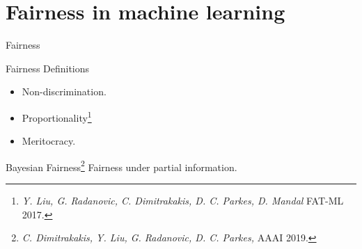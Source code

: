 \section{Fairness in machine learning}



\begin{frame}
  \begin{center} 
    {\Huge Fairness}
  \end{center}
\end{frame}


\begin{frame}
  \centering
  \begin{block}{Fairness Definitions}
    \begin{itemize}
    \item \alert{Non-discrimination}.
    \item Proportionality\footnote{\emph{Y. Liu, G. Radanovic, C. Dimitrakakis, D. C. Parkes, D. Mandal} FAT-ML 2017.}
    \item Meritocracy.
    \end{itemize}
  \end{block}
  \begin{block}{Bayesian Fairness\footnote{\emph{C. Dimitrakakis, Y. Liu, G. Radanovic, D. C. Parkes,} AAAI 2019.}}
    \Large{
      Fairness under partial information.
    }
  \end{block}


\end{frame}
